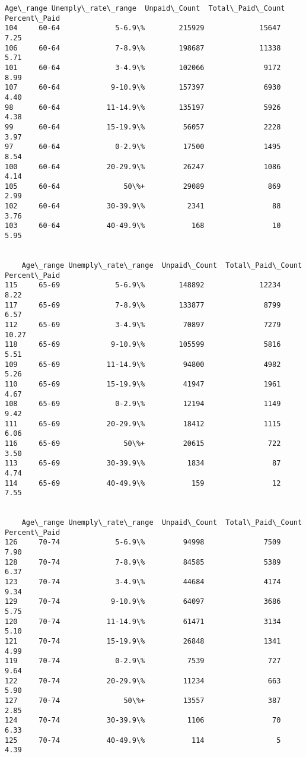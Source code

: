 \documentclass[11pt]{article}
\begin{document}
\begin{Verbatim}[commandchars=\\\{\}]
    Age\_range Unemply\_rate\_range  Unpaid\_Count  Total\_Paid\_Count  Percent\_Paid
104     60-64             5-6.9\%        215929             15647          7.25
106     60-64             7-8.9\%        198687             11338          5.71
101     60-64             3-4.9\%        102066              9172          8.99
107     60-64            9-10.9\%        157397              6930          4.40
98      60-64           11-14.9\%        135197              5926          4.38
99      60-64           15-19.9\%         56057              2228          3.97
97      60-64             0-2.9\%         17500              1495          8.54
100     60-64           20-29.9\%         26247              1086          4.14
105     60-64               50\%+         29089               869          2.99
102     60-64           30-39.9\%          2341                88          3.76
103     60-64           40-49.9\%           168                10          5.95


    Age\_range Unemply\_rate\_range  Unpaid\_Count  Total\_Paid\_Count  Percent\_Paid
115     65-69             5-6.9\%        148892             12234          8.22
117     65-69             7-8.9\%        133877              8799          6.57
112     65-69             3-4.9\%         70897              7279         10.27
118     65-69            9-10.9\%        105599              5816          5.51
109     65-69           11-14.9\%         94800              4982          5.26
110     65-69           15-19.9\%         41947              1961          4.67
108     65-69             0-2.9\%         12194              1149          9.42
111     65-69           20-29.9\%         18412              1115          6.06
116     65-69               50\%+         20615               722          3.50
113     65-69           30-39.9\%          1834                87          4.74
114     65-69           40-49.9\%           159                12          7.55


    Age\_range Unemply\_rate\_range  Unpaid\_Count  Total\_Paid\_Count  Percent\_Paid
126     70-74             5-6.9\%         94998              7509          7.90
128     70-74             7-8.9\%         84585              5389          6.37
123     70-74             3-4.9\%         44684              4174          9.34
129     70-74            9-10.9\%         64097              3686          5.75
120     70-74           11-14.9\%         61471              3134          5.10
121     70-74           15-19.9\%         26848              1341          4.99
119     70-74             0-2.9\%          7539               727          9.64
122     70-74           20-29.9\%         11234               663          5.90
127     70-74               50\%+         13557               387          2.85
124     70-74           30-39.9\%          1106                70          6.33
125     70-74           40-49.9\%           114                 5          4.39



\end{Verbatim}
\end{document}
